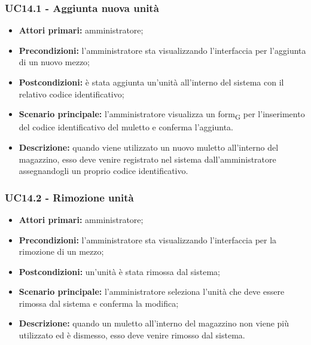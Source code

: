 \subsubsection{UC14.1 - Aggiunta nuova unità}
\begin{itemize}
	\item 	\textbf{Attori primari:} amministratore;
	\item 	\textbf{Precondizioni:} l'amministratore sta visualizzando l'interfaccia per l'aggiunta di un nuovo mezzo;
	\item 	\textbf{Postcondizioni:} è stata aggiunta un'unità all'interno del sistema con il relativo codice identificativo;
	\item 	\textbf{Scenario principale:} l'amministratore visualizza un form\textsubscript{G} per l'inserimento del codice identificativo del muletto e conferma l'aggiunta.
	\item 	\textbf{Descrizione:} quando viene utilizzato un nuovo muletto all'interno del magazzino, esso deve venire registrato nel sistema dall'amministratore assegnandogli un proprio codice identificativo.

\end{itemize}


\subsubsection{UC14.2 - Rimozione unità}
\begin{itemize}
	\item 	\textbf{Attori primari:} amministratore;
	\item 	\textbf{Precondizioni:} l'amministratore sta visualizzando l'interfaccia per la rimozione di un mezzo;
	\item 	\textbf{Postcondizioni:} un'unità è stata rimossa dal sistema;
	\item 	\textbf{Scenario principale:} l'amministratore seleziona l'unità che deve essere rimossa dal sistema e conferma la modifica;
	\item 	\textbf{Descrizione:} quando un muletto all'interno del magazzino non viene più utilizzato ed è dismesso, esso deve venire rimosso dal sistema.
	
\end{itemize}
